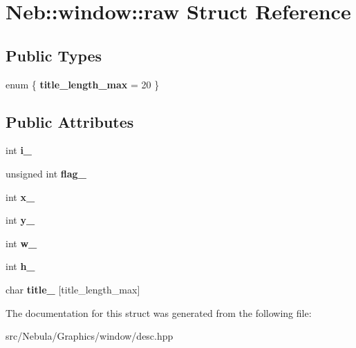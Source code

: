 \hypertarget{structNeb_1_1window_1_1raw}{\section{\-Neb\-:\-:window\-:\-:raw \-Struct \-Reference}
\label{structNeb_1_1window_1_1raw}
}
\subsection*{\-Public \-Types}
\begin{DoxyCompactItemize}
\item 
enum \{ {\bfseries title\-\_\-length\-\_\-max} =  20
 \}
\end{DoxyCompactItemize}
\subsection*{\-Public \-Attributes}
\begin{DoxyCompactItemize}
\item 
\hypertarget{structNeb_1_1window_1_1raw_ac2d99106d8032d157cb66ca692aeff8f}{int {\bfseries i\-\_\-}}\label{structNeb_1_1window_1_1raw_ac2d99106d8032d157cb66ca692aeff8f}

\item 
\hypertarget{structNeb_1_1window_1_1raw_a187363b5fae5c15e7235744dc9de7bf0}{unsigned int {\bfseries flag\-\_\-}}\label{structNeb_1_1window_1_1raw_a187363b5fae5c15e7235744dc9de7bf0}

\item 
\hypertarget{structNeb_1_1window_1_1raw_a3b273ad1ae7bcf1ae970e71d2693cf86}{int {\bfseries x\-\_\-}}\label{structNeb_1_1window_1_1raw_a3b273ad1ae7bcf1ae970e71d2693cf86}

\item 
\hypertarget{structNeb_1_1window_1_1raw_af41502c09220bda97a5b7affa78289b7}{int {\bfseries y\-\_\-}}\label{structNeb_1_1window_1_1raw_af41502c09220bda97a5b7affa78289b7}

\item 
\hypertarget{structNeb_1_1window_1_1raw_aa923cceefa9f2f721465c4369ff1dd7d}{int {\bfseries w\-\_\-}}\label{structNeb_1_1window_1_1raw_aa923cceefa9f2f721465c4369ff1dd7d}

\item 
\hypertarget{structNeb_1_1window_1_1raw_ac4be48fbeb00c89151f8f36528a4fbc7}{int {\bfseries h\-\_\-}}\label{structNeb_1_1window_1_1raw_ac4be48fbeb00c89151f8f36528a4fbc7}

\item 
\hypertarget{structNeb_1_1window_1_1raw_aa97e82faf39cfcdf355bfe1efca9f3da}{char {\bfseries title\-\_\-} \mbox{[}title\-\_\-length\-\_\-max\mbox{]}}\label{structNeb_1_1window_1_1raw_aa97e82faf39cfcdf355bfe1efca9f3da}

\end{DoxyCompactItemize}


\-The documentation for this struct was generated from the following file\-:\begin{DoxyCompactItemize}
\item 
src/\-Nebula/\-Graphics/window/desc.\-hpp\end{DoxyCompactItemize}
